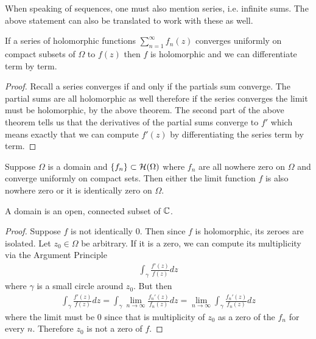 When speaking of sequences, one must also mention series, i.e. infinite sums. The above statement can also be translated to work with these as well.
\begin{corollary}
If a series of holomorphic functions $\displaystyle \sum_{n = 1}^\infty f_n(z)$ converges uniformly on compact subsets of $\Omega$ to $f(z)$ then $f$ is holomorphic and we can differentiate term by term.
\end{corollary}
\begin{proof}
    Recall a series converges if and only if the partials sum converge. The partial sums are all holomorphic as well therefore if the series converges the limit must be holomorphic, by the above theorem. The second part of the above theorem tells us that the derivatives of the partial sums converge to $f'$ which means exactly that we can compute $f'(z)$ by differentiating the series term by term.
\end{proof}

\begin{proposition}[Hurwitz]\label{lem:hurwitz}
Suppose $\Omega$ is a domain and $\{f_n\} \subset \mathcal{H}(\Omega)$ where $f_n$ are all nowhere zero on $\Omega$ and converge uniformly on compact sets. Then either the limit function $f$ is also nowhere zero or it is identically zero on $\Omega$.
\end{proposition}
\begin{remark}
    A domain is an open, connected subset of $\mathbb{C}$. 
\end{remark}
\begin{proof}
    Suppose $f$ is not identically 0. Then since $f$ is holomorphic, its zeroes are isolated. Let $z_0 \in \Omega$ be arbitrary. If it is a zero, we can compute its multiplicity via the Argument Principle
    \begin{align*}
        \int_{\gamma} \frac{f'(z)}{f(z)}dz
    \end{align*}
    where $\gamma$ is a small circle around $z_0$. But then 
    \begin{align*}
        \int_{\gamma} \frac{f'(z)}{f(z)}dz = \int_{\gamma} \lim_{n \to \infty} \frac{f_n'(z)}{f_n(z)}dz = \lim_{n \to \infty} \int_{\gamma} \frac{f_n'(z)}{f_n(z)}dz
    \end{align*}
    where the limit must be 0 since that is multiplicity of $z_0$ as a zero of the $f_n$ for every $n$. Therefore $z_0$ is not a zero of $f$.
\end{proof}


